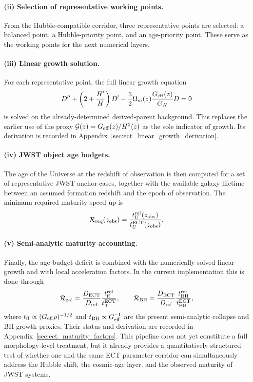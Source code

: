 \documentclass[11pt,a4paper]{article}
\numberwithin{equation}{section}
\begin{document}
\paragraph{(ii) Selection of representative working points.}
From the Hubble-compatible corridor, three representative points are
selected:
a balanced point, a Hubble-priority point, and an age-priority point.
These serve as the working points for the next numerical layers.

\paragraph{(iii) Linear growth solution.}
For each representative point, the full linear growth equation
\[
D''+\left(2+\frac{H'}{H}\right)D'
-\frac{3}{2}\Omega_m(z)\frac{G_{\rm eff}(z)}{G_N}D=0
\]
is solved on the already-determined derived-parent background.
This replaces the earlier use of the proxy
$\mathcal G(z)=G_{\rm eff}(z)/H^2(z)$ as the sole indicator of growth.
Its derivation is recorded in Appendix~\ref{sec:ect_linear_growth_derivation}.

\paragraph{(iv) JWST object age budgets.}
The age of the Universe at the redshift of observation is then computed
for a set of representative JWST anchor cases, together with the
available galaxy lifetime between an assumed formation redshift and the
epoch of observation.
The minimum required maturity speed-up is
\[
\mathcal R_{\rm req}(z_{\rm obs})
=
\frac{t_U^{\rm ref}(z_{\rm obs})}{t_U^{\rm ECT}(z_{\rm obs})}.
\]

\paragraph{(v) Semi-analytic maturity accounting.}
Finally, the age-budget deficit is combined with the numerically solved
linear growth and with local acceleration factors.
In the current implementation this is done through
\[
\mathcal R_{\rm gal}
=
\frac{D_{\rm ECT}}{D_{\rm ref}}
\frac{t_{\rm ff}^{\rm ref}}{t_{\rm ff}^{\rm ECT}},
\qquad
\mathcal R_{\rm BH}
=
\frac{D_{\rm ECT}}{D_{\rm ref}}
\frac{t_{\rm BH}^{\rm ref}}{t_{\rm BH}^{\rm ECT}},
\]
where $t_{\rm ff}\propto (G_{\rm eff}\rho)^{-1/2}$ and
$t_{\rm BH}\propto G_{\rm eff}^{-1}$ are the present semi-analytic
collapse and BH-growth proxies.
Their status and derivation are recorded in
Appendix~\ref{sec:ect_maturity_factors}.
This pipeline does not yet constitute a full morphology-level treatment,
but it already provides a quantitatively structured test of whether one
and the same ECT parameter corridor can simultaneously address the
Hubble shift, the cosmic-age layer, and the observed maturity of JWST
systems.
\end{document}
